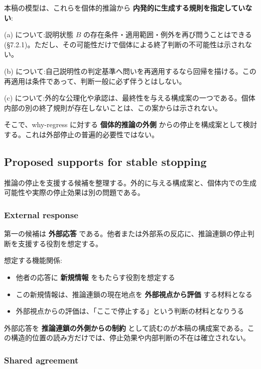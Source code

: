 本稿の模型は、これらを個体的推論から \textbf{内発的に生成する規則を指定していない}:

(a) について:説明状態 $B$ の存在条件・適用範囲・例外を再び問うことはできる(\S{}7.2.1)。ただし、その可能性だけで個体による終了判断の不可能性は示されない。

(b) について:自己説明性の判定基準へ問いを再適用するなら回帰を描ける。この再適用は条件であって、判断一般に必ず伴うとはしない。

(c) について:外的な公理化や承認は、最終性を与える構成案の一つである。個体内部の別の終了規則が存在しないことは、この案からは示されない。

そこで、why-regress に対する \textbf{個体的推論の外側} からの停止を構成案として検討する。これは外部停止の普遍的必要性ではない。

\subsection{Proposed supports for stable stopping}


推論の停止を支援する候補を整理する。外的に与える構成案と、個体内での生成可能性や実際の停止効果は別の問題である。

\subsubsection{External response}


第一の候補は \textbf{外部応答} である。他者または外部系の反応に、推論連鎖の停止判断を支援する役割を想定する。

想定する機能関係:

\begin{itemize}
\item 他者の応答に \textbf{新規情報} をもたらす役割を想定する
\item この新規情報は、推論連鎖の現在地点を \textbf{外部視点から評価} する材料となる
\item 外部視点からの評価は、「ここで停止する」という判断の材料となりうる
\end{itemize}

外部応答を \textbf{推論連鎖の外側からの制約} として読むのが本稿の構成案である。この構造的位置の読み方だけでは、停止効果や内部判断の不在は確立されない。

\subsubsection{Shared agreement}


